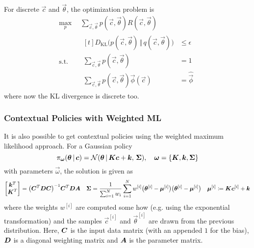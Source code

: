 				For discrete \(\vec{c}\) and \(\vec{\theta}\), the optimization problem is
				\begin{equation*}
					\begin{aligned}
						\max_p \,& \sum_{\vec{c}, \vec{\theta}} p(\vec{c}, \vec{\theta}) R(\vec{c}, \vec{\theta}) \\
						\mathrm{s.t.} \quad&
							\begin{aligned}[t]
								D_\mathrm{KL}\big( p(\vec{c}, \vec{\theta}) \,\Vert\, q(\vec{c}, \vec{\theta}) \big) &\leq \epsilon \\
								\sum_{\vec{c}, \vec{\theta}} p(\vec{c}, \vec{\theta}) &= 1 \\
								\sum_{\vec{c}, \vec{\theta}} p(\vec{c}, \vec{\theta}) \vec{\phi}(\vec{c}) &= \hat{\vec{\phi}}
							\end{aligned}
					\end{aligned}
				\end{equation*}
				where now the KL divergence is discrete too.

			\subsubsection{Contextual Policies with Weighted ML}
				It is also possible to get contextual policies using the weighted maximum likelihood approach. For a Gaussian policy
				\begin{equation*}
					\pi_{\bm{\omega}}(\bm{\theta} \,\vert\, \bm{c}) = \mathcal{N}(\bm{\theta} \,\vert\, \bm{K} \bm{c} + \bm{k},\, \bm{\Sigma}),\quad \bm{\omega} = \{ \bm{K}, \bm{k}, \bm{\Sigma} \}
				\end{equation*}
				with parameters \(\vec{\omega}\), the solution is given as
				\begin{align*}
					\begin{bmatrix}
						\bm{k}^T \\
						\bm{K}^T
					\end{bmatrix} = \big( \bm{C}^T \bm{D} \bm{C} \big)^{-1} \bm{C}^T \bm{D} \bm{A}
					&&
					\bm{\Sigma} = \frac{1}{\sum_{i = 1}^{N} w_i} \sum_{i = 1}^{N} w^{[i]} \big( \bm{\theta}^{[i]} - \bm{\mu}^{[i]} \big) \big( \bm{\theta}^{[i]} - \bm{\mu}^{[i]} \big)
					&&
					\bm{\mu}^{[i]} \coloneqq \bm{K} \bm{c}^{[i]} + \bm{k}
				\end{align*}
				where the weights \( w^{[i]} \) are computed some how (e.g. using the exponential transformation) and the samples \( \vec{c}^{[i]} \) and \( \vec{\theta}^{[i]} \) are drawn from the previous distribution. Here, \(\bm{C}\) is the input data matrix (with an appended \(1\) for the bias), \(\bm{D}\) is a diagonal weighting matrix and \(\bm{A}\) is the parameter matrix.

